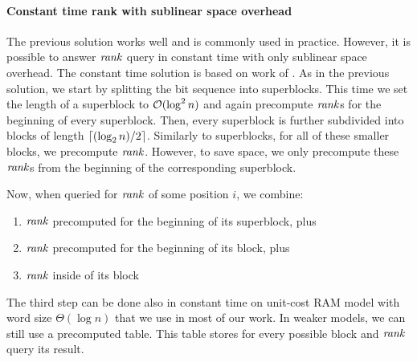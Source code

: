 \paragraph{Constant time rank with sublinear space overhead}

The previous solution works well and is commonly used in practice. However, it is possible to
answer $\mathit{rank}$ query in constant time with only sublinear space overhead. The constant time
solution is based on work of \cite{jacobson1988succinct}. As in the previous solution, we start
by splitting the bit sequence into superblocks. This time we set the length of a superblock to
$\mathcal{O}(\log^2 n)$ and again precompute $\mathit{rank}$s for the beginning of every superblock. Then, every
superblock is further subdivided into blocks of length $\left\lceil (\log_2 n)/2 \right\rceil$. Similarly to superblocks,
for all of these smaller blocks, we precompute $\mathit{rank}$. However, to save space, we only precompute
these $\mathit{rank}$s from the beginning of the corresponding superblock.

Now, when queried for $\mathit{rank}$ of some position $i$, we combine:
\begin{enumerate}
    \item $\mathit{rank}$ precomputed for the beginning of its superblock, plus
    \item $\mathit{rank}$ precomputed for the beginning of its block, plus
    \item $\mathit{rank}$ inside of its block
\end{enumerate}

The third step can be done also in constant time on unit-cost RAM model with word size $\Theta(\log n)$
that we use in most of our work. In weaker models, we can still use a precomputed table. This table stores
for every possible block and $\mathit{rank}$ query its result. 

